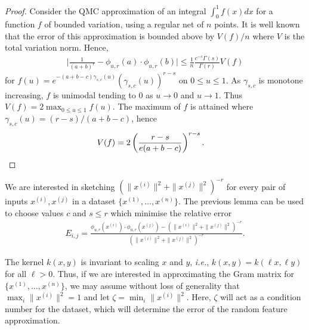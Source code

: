\begin{proof}
Consider the QMC approximation of an integral $\int_0^1 f(x)dx$ for a function $f$ of bounded variation, using a regular net of $n$ points. It is well known that the error of this approximation is bounded above by $V(f)/n$ where $V$ is the total variation norm. Hence, 
\begin{align*}
\Big| \frac{1}{(a+b)^r} - \phi_{u,r}(a)\cdot \phi_{u,r}(b) \Big| \leq \frac{1}{n} \frac{c^{-s}\Gamma(s)}{\Gamma(r)} V(f)
\end{align*}
for $f(u)= e^{-(a+b-c)\gamma_{s,c}(u)} (\gamma_{s,c}(u))^{r-s}$ on $0\leq u\leq 1$. As $\gamma_{s,c}$ is monotone increasing, $f$ is unimodal tending to $0$ as $u\to 0$ and $u\to 1$. Thus $V(f)=2\max_{0\le u\le 1} f(u)$.
The maximum of $f$ is attained where $\gamma_{s,c}(u)= (r-s)/(a+b-c)$, hence 
\begin{align*}
V(f) = 2\left(\frac{r-s}{e(a+b-c)}\right)^{r-s}. & \qedhere
\end{align*}
\end{proof}

We are interested in sketching $( \| x^{(i)} \| ^2+ \| x^{(j)} \| ^2)^{-r}$ for every pair of inputs $x^{(i)}, x^{(j)}$ in a dataset $\{x^{(1)},\dots,x^{(n)}\}$. The previous lemma can be used to choose values $c$ and $s\le r$ which minimise the relative error
\begin{align*}
E_{i,j} = \frac{   \phi_{u,r}(  x^{(i)} )\cdot \phi_{u,r}( x^{(j)} ) - (\| x^{(i)} \| ^2+ \| x^{(j)} \| ^2)^{-r} }{( \| x^{(i)} \| ^2+ \| x^{(j)} \| ^2)^{-r}} .
\end{align*}

The kernel $k(x,y)$ is invariant to scaling $x$ and $y$, \emph{i.e.}, $k(x,y)=k(\ell x,\ell y)$ for all $\ell>0$. Thus, if we are interested in approximating the Gram matrix for $\{x^{(1)},\dots,x^{(n)}\}$, we may assume without loss of generality that $\max_i  \| x^{(i)} \| ^2 = 1$ and let $\zeta = \min_i  \| x^{(i)} \| ^2$. Here, $\zeta$ will act as a condition number for the dataset, which will determine the error of the random feature approximation.

